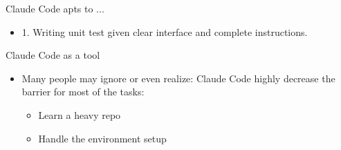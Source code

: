 \documentclass[aspectratio=169]{beamer}
\begin{document}
\begin{frame}{Claude Code apts to ...}
	\begin{itemize}
		\item 1. Writing unit test given clear interface and complete instructions.
	\end{itemize}
\end{frame}


\begin{frame}{Claude Code as a tool}
	\begin{itemize}
		\item Many people may ignore or even realize: Claude Code highly
		decrease the barrier for most of the tasks:
		\begin{itemize}
			\item Learn a heavy repo
			\item Handle the environment setup
		\end{itemize}
	\end{itemize}
\end{frame}






 
 
\end{document}
